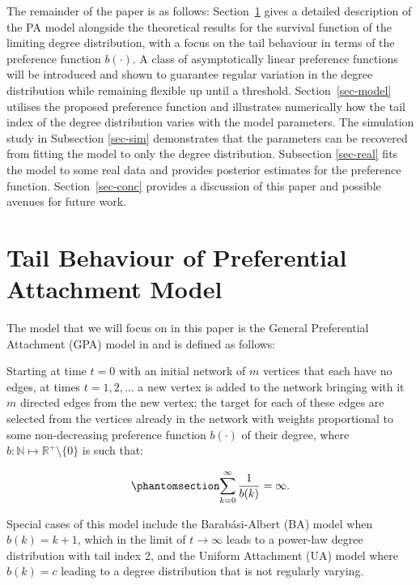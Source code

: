 \documentclass[
  sn-basic,
]{sn-jnl}
\theoremstyle{plain}
\theoremstyle{plain}
\theoremstyle{remark}
\begin{document}
The remainder of the paper is as follows: Section~\ref{sec-tail} gives a
detailed description of the PA model alongside the theoretical results
for the survival function of the limiting degree distribution, with a
focus on the tail behaviour in terms of the preference function
\(b(\cdot)\). A class of asymptotically linear preference functions will
be introduced and shown to guarantee regular variation in the degree
distribution while remaining flexible up until a threshold.
Section~\ref{sec-model} utilises the proposed preference function and
illustrates numerically how the tail index of the degree distribution
varies with the model parameters. The simulation study in Subsection
\ref{sec-sim} demonstrates that the parameters can be recovered from
fitting the model to only the degree distribution. Subsection
\ref{sec-real} fits the model to some real data and provides posterior
estimates for the preference function. Section~\ref{sec-conc} provides a
discussion of this paper and possible avenues for future work.

\newpage

\section{Tail Behaviour of Preferential Attachment
Model}\label{sec-tail}

The model that we will focus on in this paper is the General
Preferential Attachment (GPA) model in \citet{rudas07} and is defined as
follows:

Starting at time \(t=0\) with an initial network of \(m\) vertices that
each have no edges, at times \(t=1,2,\ldots\) a new vertex is added to
the network bringing with it \(m\) directed edges from the new vertex;
the target for each of these edges are selected from the vertices
already in the network with weights proportional to some non-decreasing
preference function \(b(\cdot)\) of their degree, where
\(b: \mathbb N \mapsto \mathbb R^+\setminus\{0\}\) is such that:

\begin{equation}\phantomsection\label{eq-condb2}{
\sum_{k=0}^\infty\frac{1}{b(k)} = \infty.
}\end{equation}

Special cases of this model include the Barab\'asi-Albert (BA) model when $b(k) = k+1$, which in the limit of $t\rightarrow \infty$ leads to a power-law degree distribution with tail index 2, and the Uniform Attachment (UA) model where $b(k)=c$ leading to a degree distribution that is not regularly varying.
\end{document}
